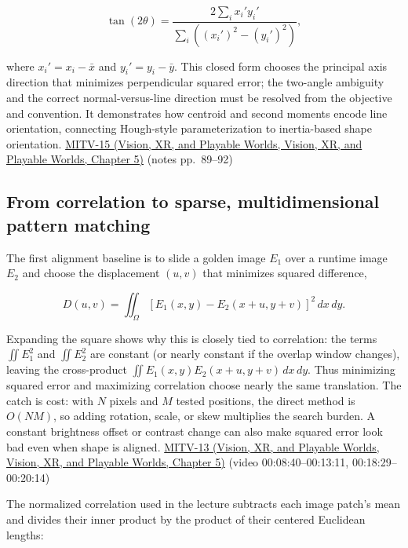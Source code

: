 \[
\tan(2\theta)=\frac{2\sum_i x_i'y_i'}{\sum_i((x_i')^2-(y_i')^2)},
\]

where \(x_i'=x_i-\bar{x}\) and \(y_i'=y_i-\bar{y}\). This closed form chooses the principal axis direction that minimizes perpendicular squared error; the two-angle ambiguity and the correct normal-versus-line direction must be resolved from the objective and convention. It demonstrates how centroid and second moments encode line orientation, connecting Hough-style parameterization to inertia-based shape orientation. \href{../07-Vision-XR-and-Playable-Worlds/main.pdf\#nameddest=04-visual-computing-ii-ch036-mitv-15---alignment-patmax-distance-field-filtering-and-sub-sampling-us-7065262}{MITV-15 (Vision, XR, and Playable Worlds, Vision, XR, and Playable Worlds, Chapter 5)} (notes pp.~89--92)

\subsection{From correlation to sparse, multidimensional pattern matching}\label{04-visual-computing-ii-ch030-from-correlation-to-sparse-multidimensional-pattern-matching}

The first alignment baseline is to slide a golden image \(E_1\) over a runtime image \(E_2\) and choose the displacement \((u,v)\) that minimizes squared difference,

\[
D(u,v)=\iint_\Omega [E_1(x,y)-E_2(x+u,y+v)]^2\,dx\,dy.
\]

Expanding the square shows why this is closely tied to correlation: the terms \(\iint E_1^2\) and \(\iint E_2^2\) are constant (or nearly constant if the overlap window changes), leaving the cross-product \(\iint E_1(x,y)E_2(x+u,y+v)\,dx\,dy\). Thus minimizing squared error and maximizing correlation choose nearly the same translation. The catch is cost: with \(N\) pixels and \(M\) tested positions, the direct method is \(O(NM)\), so adding rotation, scale, or skew multiplies the search burden. A constant brightness offset or contrast change can also make squared error look bad even when shape is aligned. \href{../07-Vision-XR-and-Playable-Worlds/main.pdf\#nameddest=04-visual-computing-ii-ch036-mitv-13---object-detection-recognition-and-pose-determination-patquick-us-7016539}{MITV-13 (Vision, XR, and Playable Worlds, Vision, XR, and Playable Worlds, Chapter 5)} (video 00:08:40--00:13:11, 00:18:29--00:20:14)

The normalized correlation used in the lecture subtracts each image patch's mean and divides their inner product by the product of their centered Euclidean lengths:

